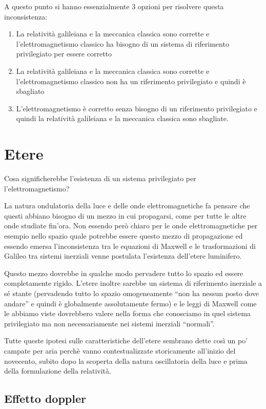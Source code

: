 \documentclass[12pt,a4paper,titlepage, twoside, openright]{book}
\numberwithin{equation}{chapter}
\begin{document}
A questo punto si hanno essenzialmente $3$ opzioni per risolvere questa inconsistenza:\begin{enumerate}
\item La relatività galileiana e la meccanica classica sono corrette e l'elettromagnetismo classico ha bisogno di un sistema di riferimento privilegiato per essere corretto
\item La relatività galileiana e la meccanica classica sono corrette e l'elettromagnetismo classico non ha un riferimento privilegiato e quindi è sbagliato
\item L'elettromagnetismo è corretto senza bisogno di un riferimento privilegiato e quindi la relatività galileiana e la meccanica classica sono sbagliate.
\end{enumerate}

\section{Etere}

Cosa significherebbe l'esistenza di un sistema privilegiato per l'elettromagnetismo?

La natura ondulatoria della luce e delle onde elettromagnetiche fa pensare che questi abbiano bisogno di un mezzo in cui propagarsi, come per tutte le altre onde studiate fin'ora. Non essendo però chiaro per le onde elettromagnetiche per esempio nello spazio quale potrebbe essere questo mezzo di propagazione ed essendo emersa l'inconsistenza tra le equazioni di Maxwell e le trasformazioni di Galileo tra sistemi inerziali venne postulata l'esistenza dell'etere luminifero. 

Questo mezzo dovrebbe in qualche modo pervadere tutto lo spazio ed essere completamente rigido. 
L'etere inoltre sarebbe un sistema di riferimento inerziale a sé stante (pervadendo tutto lo spazio omogeneamente ``non ha nessun posto dove andare''  e quindi è globalmente assolutamente fermo) e le leggi di Maxwell come le abbiamo viste dovrebbero valere nella forma che conosciamo in quel sistema privilegiato ma non necessariamente nei sistemi inerziali ``normali''.

Tutte queste ipotesi sulle caratteristiche dell'etere sembrano dette così un po' campate per aria perchè vanno contestualizzate storicamente all'inizio del novecento, subito dopo la scoperta della natura oscillatoria della luce e prima della formulazione della relatività.

\subsection{Effetto doppler}
\end{document}
